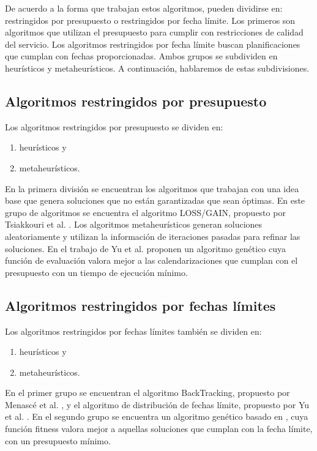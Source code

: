 De acuerdo a la forma que trabajan estos algoritmos, pueden dividirse en: restringidos por presupuesto o restringidos por fecha límite. Los primeros son algoritmos que utilizan el presupuesto para cumplir con restricciones de calidad del servicio. Los algoritmos restringidos por fecha límite buscan planificaciones que cumplan con fechas proporcionadas. Ambos grupos se subdividen en heurísticos y metaheurísticos. A continuación, hablaremos de estas subdivisiones.

\subsection{Algoritmos restringidos por presupuesto}

Los algoritmos restringidos por presupuesto se dividen en: 

\begin{enumerate}
\item{heurísticos y}
\item{metaheurísticos.}
\end{enumerate}

En la primera división se encuentran los algoritmos que trabajan con una idea base que genera soluciones que no están garantizadas que sean óptimas. En este grupo de algoritmos se encuentra el algoritmo LOSS/GAIN, propuesto por Tsiakkouri et al. \cite{sakellariou2007scheduling}. Los algoritmos metaheurísticos generan soluciones aleatoriamente y utilizan la información de iteraciones pasadas para refinar las soluciones. En el trabajo de Yu et al. \cite{yu2006scheduling} proponen un algoritmo genético cuya función de evaluación valora mejor a las calendarizaciones que cumplan con el presupuesto con un tiempo de ejecución mínimo.

\subsection{Algoritmos restringidos por fechas límites}

Los algoritmos restringidos por fechas límites también se dividen en:

\begin{enumerate}
\item{heurísticos y}
\item{metaheurísticos.}
\end{enumerate}

En el primer grupo se encuentran el algoritmo BackTracking, propuesto por Menascé et al. \cite{menasce2004framework}, y el algoritmo de distribución de fechas límite, propuesto por Yu et al. \cite{yu2005cost}. En el segundo grupo se encuentra un algoritmo genético basado en \cite{yu2006scheduling}, cuya función fitness valora mejor a aquellas soluciones que cumplan con la fecha límite, con un presupuesto mínimo.

